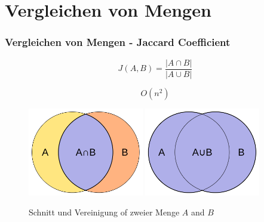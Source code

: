 \section{Vergleichen von Mengen}

\begin{frame}
    \frametitle{Vergleichen von Mengen - Jaccard Coefficient}


    \begin{equation}
        J(A,B) = \frac{ | A \cap B | }{ | A \cup B | }
    \end{equation}

    \pause

    \begin{equation}
        O(n^2)
    \end{equation}


    \pause

    \begin{figure}[H]
        \centering
        \includegraphics[width=0.45\textwidth]{images/Intersection_of_sets_A_and_B.png} 
        \includegraphics[width=0.45\textwidth]{images/Union_of_sets_A_and_B.png}
        \caption{Schnitt und Vereinigung of zweier Menge $ A $ and $ B $ \cite{intersectionImage,unionImage}}
    \end{figure}
\end{frame}


